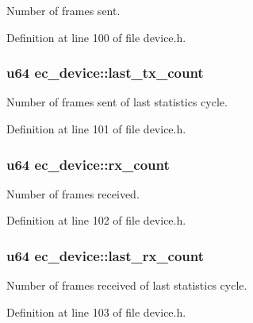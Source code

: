 \-Number of frames sent. 



\-Definition at line 100 of file device.\-h.

\subsubsection[{last\-\_\-tx\-\_\-count}]{\setlength{\rightskip}{0pt plus 5cm}u64 {\bf ec\-\_\-device\-::last\-\_\-tx\-\_\-count}}\label{structec__device_afca221601cff7e6280283df48902a019}


\-Number of frames sent of last statistics cycle. 



\-Definition at line 101 of file device.\-h.

\subsubsection[{rx\-\_\-count}]{\setlength{\rightskip}{0pt plus 5cm}u64 {\bf ec\-\_\-device\-::rx\-\_\-count}}\label{structec__device_ab53eaa1db2b7696c28f06146fd253786}


\-Number of frames received. 



\-Definition at line 102 of file device.\-h.

\subsubsection[{last\-\_\-rx\-\_\-count}]{\setlength{\rightskip}{0pt plus 5cm}u64 {\bf ec\-\_\-device\-::last\-\_\-rx\-\_\-count}}\label{structec__device_a5ad25fde7d43696988dcb602fa947a7b}


\-Number of frames received of last statistics cycle. 



\-Definition at line 103 of file device.\-h.

